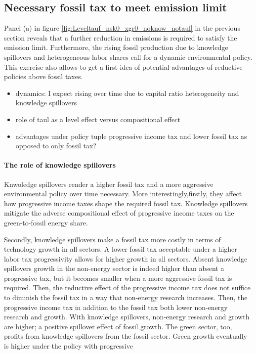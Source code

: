  \clearpage
 
 \subsection{Necessary fossil tax to meet emission limit}
 Panel (a) in figure \ref{fig:Leveltauf_nsk0_xgr0_noknow_notaul} in the previous section reveals that a further reduction in emissions is required to satisfy the emission limit. Furthermore, the rising fossil production due to knowledge spillovers and heterogeneous labor shares call for a dynamic environmental policy. 
 This exercise also allows to get a first idea of potential advantages of reductive policies above fossil taxes. 
 
 \begin{itemize}
 	\item dynamics: I expect rising over time due to capital ratio heterogeneity and knowledge spillovers
 	\item role of taul as a level effect versus compositional effect
 	\item advantages under policy tuple progressive income tax and lower fossil tax as opposed to only fossil tax?
 \end{itemize}

\paragraph{The role of knowledge spillovers}
Knwoledge spillovers render a higher fossil tax and a more aggressive environmental policy over time necessary. 
More interestingly,firstly, they affect how progressive income taxes shape the required fossil tax. Knowledge spillovers mitigate the adverse compositional effect of progressive income taxes on the green-to-fossil energy share. %

Secondly, knowledge spillovers make a fossil tax more costly in terms of technology growth in all sectors.  A lower fossil tax acceptable under a higher labor tax progressivity allows for higher growth in all sectors. 
Absent knowledge spillovers growth in the non-energy sector is indeed higher than absent a progressive tax, but it becomes smaller when a more aggressive fossil tax is required. Then, the reductive effect of the progressive income tax does not suffice to diminish the fossil tax in a way that non-energy research increases. Then, the progressive income tax in addition to the fossil tax both lower non-energy research and growth. With knowledge spillovers, non-energy research and growth are higher; a positive spillover effect of fossil growth. The green sector, too, profits from knowledge spillovers from the fossil sector. Green growth eventually is higher under the policy with progressive 

